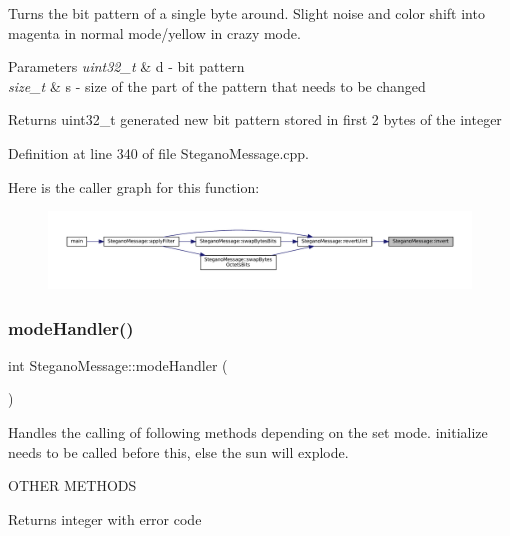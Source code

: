 Turns the bit pattern of a single byte around. Slight noise and color shift into magenta in normal mode/yellow in crazy mode. 


\begin{DoxyParams}{Parameters}
{\em uint32\+\_\+t} & d -\/ bit pattern \\
\hline
{\em size\+\_\+t} & s -\/ size of the part of the pattern that needs to be changed \\
\hline
\end{DoxyParams}
\begin{DoxyReturn}{Returns}
uint32\+\_\+t generated new bit pattern stored in first 2 bytes of the integer 
\end{DoxyReturn}


Definition at line 340 of file Stegano\+Message.\+cpp.

Here is the caller graph for this function\+:
\nopagebreak
\begin{figure}[H]
\begin{center}
\leavevmode
\includegraphics[width=350pt]{classSteganoMessage_af46fa3a09a19fc73c146e22d6a32657a_icgraph}
\end{center}
\end{figure}
\mbox{\label{classSteganoMessage_a2649e515941e730520b759282d00dcd6}} 
\subsubsection{\texorpdfstring{modeHandler()}{modeHandler()}}
{\footnotesize\ttfamily int Stegano\+Message\+::mode\+Handler (\begin{DoxyParamCaption}{ }\end{DoxyParamCaption})}



Handles the calling of following methods depending on the set mode. initialize needs to be called before this, else the sun will explode. 

O\+T\+H\+ER M\+E\+T\+H\+O\+DS\begin{DoxyReturn}{Returns}
integer with error code 
\end{DoxyReturn}



